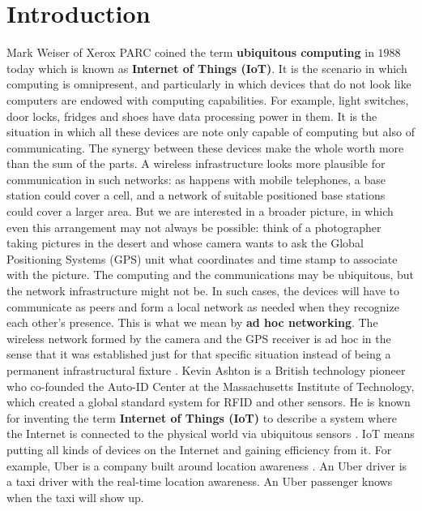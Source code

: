 \chapter{Introduction} %
\label{cha:introduction}
	
	Mark Weiser of Xerox PARC \cite{weiser1991computer} coined the term \textbf{ubiquitous computing} in $1988$ today which is known as \textbf{Internet of Things (IoT)}. 
	It is the scenario in which computing is omnipresent, and particularly in which devices that do not look like computers are endowed with computing capabilities.
	For example, light switches, door locks, fridges and shoes have data processing power in them.
	It is the situation in which all these devices are note only capable of computing but also of communicating.
	The synergy between these devices make the whole worth more than the sum of the parts.
	A wireless infrastructure looks more plausible for communication in such networks: as happens with mobile telephones, a base station could cover a cell, and a network of suitable positioned base stations could cover a larger area.
	But we are interested in a broader picture, in which even this arrangement may not always be possible: think of a photographer taking pictures in the desert and whose camera wants to ask the Global Positioning Systems (GPS) unit what coordinates and time stamp to associate with the picture.
	The computing and the communications may be ubiquitous, but the network infrastructure might not be.
	In such cases, the devices will have to communicate as peers and form a local network as needed when they recognize each other's presence.
	This is what we mean by \textbf{ad hoc networking}.
	The wireless network formed by the camera and the GPS receiver is ad hoc in the sense that it was established just for that specific situation instead of being a permanent infrastructural fixture \cite{2002-Stajano-ubiquitous}.
	Kevin Ashton is a British technology pioneer who co-founded the Auto-ID Center at the Massachusetts Institute of Technology, which created a global standard system for RFID and other sensors.
	He is known for inventing the term \textbf{Internet of Things (IoT)} to describe a system where the Internet is connected to the physical world via ubiquitous sensors \cite{ashton2009internet}.
	IoT means putting all kinds of devices on the Internet and gaining efficiency from it. 
	For example, Uber is a company built around location awareness \cite{Uber}.
	An Uber driver is a taxi driver with the real-time location awareness.
	An Uber passenger knows when the taxi will show up.
